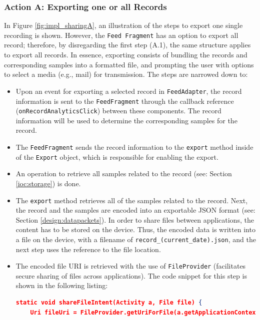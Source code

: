 \subsubsection{Action A: Exporting one or all Records}
In Figure \ref{fig:impl_sharingA}, an illustration of the steps to export one single recording is shown. However, the \verb|Feed Fragment| has an option to export all record; therefore, by disregarding the first step (A.1), the same structure applies to export all records. In essence, exporting consists of bundling the records and corresponding samples into a formatted file, and prompting the user with options to select a media (e.g., mail) for transmission. The steps are narrowed down to: 

\begin{itemize}
    \item[A.1] Upon an event for exporting a selected record in \verb|FeedAdapter|, the record information is sent to the \verb|FeedFragment| through the callback reference (\verb|onRecordAnalyticsClick|) between these components. The record information will be used to determine the corresponding samples for the record.
    \item[A.2] The \verb|FeedFragment| sends the record information to the \verb|export| method inside of the \verb|Export| object, which is responsible for enabling the export. 
    \item[A.3] An operation to retrieve all samples related to the record (see: Section \ref{ioc:storage}) is done. 
    \item[A.4] The \verb|export| method retrieves all of the samples related to the record. Next, the record and the samples are encoded into an exportable JSON format (see: Section \ref{design:datapackets}). In order to share files between applications, the content has to be stored on the device. Thus, the encoded data is written into a file on the device, with a filename of \verb|record_(current_date).json|, and the next step uses the reference to the file location. 
    \item[A.5] The encoded file URI is retrieved with the use of \verb|FileProvider| (facilitates secure sharing of files across applications). The code snippet for this step is shown in the following listing: 
\begin{lstlisting}[language=json, caption={}, captionpos=b]
static void shareFileIntent(Activity a, File file) {
    Uri fileUri = FileProvider.getUriForFile(a.getApplicationContext(), a.getApplicationContext().getPackageName() + ".provider", file);


\end{lstlisting}
\end{itemize}
